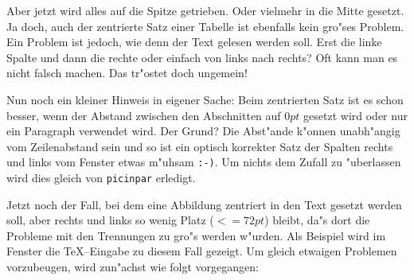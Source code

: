\sloppy
Aber jetzt wird alles auf die Spitze getrieben. Oder vielmehr
in die Mitte gesetzt. Ja doch, auch der zentrierte Satz einer Tabelle
ist ebenfalls kein gro"ses Problem. Ein Problem ist jedoch, wie denn
der Text gelesen werden soll. Erst die linke Spalte und dann die
rechte oder einfach von links nach rechts? Oft kann man es nicht
falsch machen. Das tr"ostet doch ungemein!

Nun noch ein kleiner Hinweis in eigener Sache:
Beim zentrierten Satz ist es schon besser, wenn der Abstand zwischen
den Abschnitten auf $0pt$ gesetzt wird oder nur ein Paragraph verwendet
wird. Der Grund? Die Abst"ande k"onnen unabh"angig vom Zeilenabstand
sein und so ist ein optisch korrekter Satz der Spalten rechts und
links vom Fenster etwas m"uhsam {\tt :-)}. Um nichts dem Zufall zu
"uberlassen wird dies gleich von {\tt picinpar} erledigt.
\end{tabwindow}

Jetzt noch der Fall, bei dem eine Abbildung zentriert in den Text gesetzt
werden soll, aber rechts und links so wenig Platz ($<=72pt$) bleibt,
da"s dort die Probleme mit den Trennungen zu gro"s werden w"urden. Als
Beispiel wird im Fenster die \TeX{}--Eingabe zu diesem Fall gezeigt. Um
gleich etwaigen Problemen vorzubeugen, wird zun"achst wie folgt vorgegangen:

